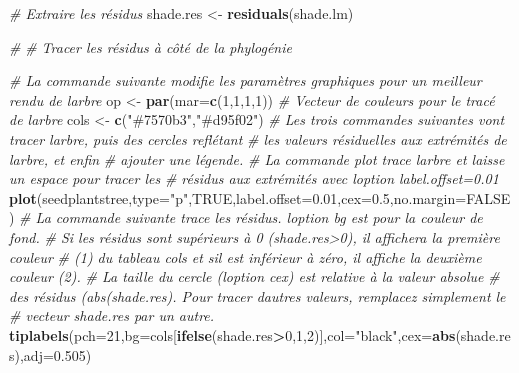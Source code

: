 \documentclass[
]{book}
\newenvironment{Shaded}{\begin{snugshade}}{\end{snugshade}}
\newcommand{\AttributeTok}[1]{\textcolor[rgb]{0.13,0.29,0.53}{#1}}
\newcommand{\CommentTok}[1]{\textcolor[rgb]{0.56,0.35,0.01}{\textit{#1}}}
\newcommand{\ConstantTok}[1]{\textcolor[rgb]{0.56,0.35,0.01}{#1}}
\newcommand{\DecValTok}[1]{\textcolor[rgb]{0.00,0.00,0.81}{#1}}
\newcommand{\FloatTok}[1]{\textcolor[rgb]{0.00,0.00,0.81}{#1}}
\newcommand{\FunctionTok}[1]{\textcolor[rgb]{0.13,0.29,0.53}{\textbf{#1}}}
\newcommand{\NormalTok}[1]{#1}
\newcommand{\OtherTok}[1]{\textcolor[rgb]{0.56,0.35,0.01}{#1}}
\newcommand{\SpecialCharTok}[1]{\textcolor[rgb]{0.81,0.36,0.00}{\textbf{#1}}}
\newcommand{\StringTok}[1]{\textcolor[rgb]{0.31,0.60,0.02}{#1}}
\begin{document}
\begin{Shaded}
\begin{Highlighting}[]
\CommentTok{\# Extraire les résidus}
\NormalTok{shade.res }\OtherTok{\textless{}{-}} \FunctionTok{residuals}\NormalTok{(shade.lm)}

\CommentTok{\#}
\CommentTok{\# Tracer les résidus à côté de la phylogénie}

\CommentTok{\# La commande suivante modifie les paramètres graphiques pour un meilleur rendu de l\textquotesingle{}arbre}
\NormalTok{op }\OtherTok{\textless{}{-}} \FunctionTok{par}\NormalTok{(}\AttributeTok{mar=}\FunctionTok{c}\NormalTok{(}\DecValTok{1}\NormalTok{,}\DecValTok{1}\NormalTok{,}\DecValTok{1}\NormalTok{,}\DecValTok{1}\NormalTok{))}
\CommentTok{\# Vecteur de couleurs pour le tracé de l\textquotesingle{}arbre}
\NormalTok{cols }\OtherTok{\textless{}{-}} \FunctionTok{c}\NormalTok{(}\StringTok{"\#7570b3"}\NormalTok{,}\StringTok{"\#d95f02"}\NormalTok{)}
\CommentTok{\# Les trois commandes suivantes vont tracer l\textquotesingle{}arbre, puis des cercles reflétant }
\CommentTok{\#  les valeurs résiduelles aux extrémités de l\textquotesingle{}arbre, et enfin}
\CommentTok{\#  ajouter une légende.}
\CommentTok{\# La commande plot trace l\textquotesingle{}arbre et laisse un espace pour tracer les }
\CommentTok{\#  résidus aux extrémités avec l\textquotesingle{}option \textquotesingle{}label.offset=0.01\textquotesingle{}}
\FunctionTok{plot}\NormalTok{(seedplantstree,}\AttributeTok{type=}\StringTok{"p"}\NormalTok{,}\ConstantTok{TRUE}\NormalTok{,}\AttributeTok{label.offset=}\FloatTok{0.01}\NormalTok{,}\AttributeTok{cex=}\FloatTok{0.5}\NormalTok{,}\AttributeTok{no.margin=}\ConstantTok{FALSE}\NormalTok{)}
\CommentTok{\# La commande suivante trace les résidus. l\textquotesingle{}option \textquotesingle{}bg\textquotesingle{} est pour la couleur de fond.}
\CommentTok{\#  Si les résidus sont supérieurs à 0 (shade.res\textgreater{}0), il affichera la première couleur}
\CommentTok{\#  (1) du tableau \textquotesingle{}cols\textquotesingle{} et s\textquotesingle{}il est inférieur à zéro, il affiche la deuxième couleur (2). }
\CommentTok{\#  La taille du cercle (l\textquotesingle{}option \textquotesingle{}cex\textquotesingle{}) est relative à la valeur absolue }
\CommentTok{\#  des résidus (abs(shade.res). Pour tracer d\textquotesingle{}autres valeurs, remplacez simplement le }
\CommentTok{\#  vecteur \textquotesingle{}shade.res\textquotesingle{} par un autre.}
\FunctionTok{tiplabels}\NormalTok{(}\AttributeTok{pch=}\DecValTok{21}\NormalTok{,}\AttributeTok{bg=}\NormalTok{cols[}\FunctionTok{ifelse}\NormalTok{(shade.res}\SpecialCharTok{\textgreater{}}\DecValTok{0}\NormalTok{,}\DecValTok{1}\NormalTok{,}\DecValTok{2}\NormalTok{)],}\AttributeTok{col=}\StringTok{"black"}\NormalTok{,}\AttributeTok{cex=}\FunctionTok{abs}\NormalTok{(shade.res),}\AttributeTok{adj=}\FloatTok{0.505}\NormalTok{)}

\end{Highlighting}
\end{Shaded}
\end{document}
